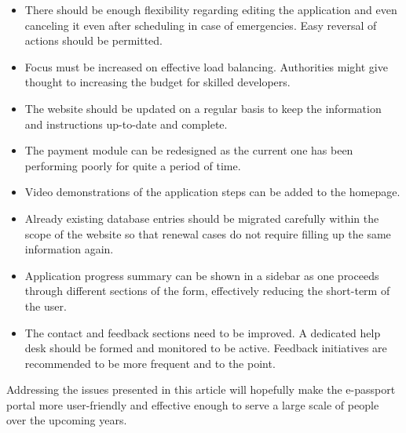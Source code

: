 \begin{itemize}
    \item There should be enough flexibility regarding editing the application and even canceling it even after scheduling in case of emergencies. Easy reversal of actions should be permitted. 
    \item Focus must be increased on effective load balancing. Authorities might give thought to increasing the budget for skilled developers.
    \item The website should be updated on a regular basis to keep the information and instructions up-to-date and complete. 
    \item The payment module can be redesigned as the current one has been performing poorly for quite a period of time. 
    \item Video demonstrations of the application steps can be added to the homepage.
    \item Already existing database entries should be migrated carefully within the scope of the website so that renewal cases do not require filling up the same information again.
    \item Application progress summary can be shown in a sidebar as one proceeds through different sections of the form, effectively reducing the short-term of the user.
    \item The contact and feedback sections need to be improved. A dedicated help desk should be formed and monitored to be active. Feedback initiatives are recommended to be more frequent and to the point.
\end{itemize} 

Addressing the issues presented in this article will hopefully make the e-passport portal more user-friendly and effective enough to serve a large scale of people over the upcoming years.